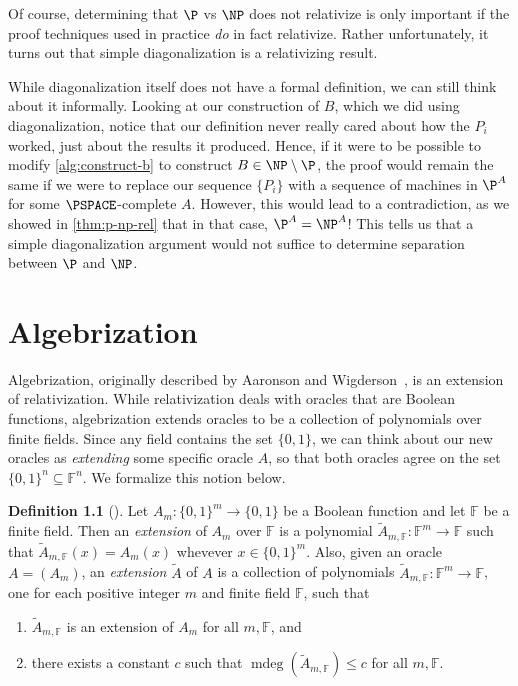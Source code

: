 \documentclass[english]{reedthesis}
\theoremstyle{plain}
\theoremstyle{definition}
\newtheorem{defn}[defn]{Definition}
\theoremstyle{remark}
\DeclareMathOperator{\mdeg}{mdeg}
\begin{document}
Of course, determining that $\P$ vs $\NP$ does not relativize is only important
if the proof techniques used in practice \emph{do} in fact relativize. Rather
unfortunately, it turns out that simple diagonalization is a relativizing
result.

While diagonalization itself does not have a formal definition, we can still
think about it informally. Looking at our construction of $B$, which we did
using diagonalization, notice that our definition never really cared about how
the $P_{i}$ worked, just about the results it produced. Hence, if it were to be
possible to modify \cref{alg:construct-b} to construct $B \in \NP \setminus \P$, the proof
would remain the same if we were to replace our sequence $\{P_{i}\}$ with a
sequence of machines in $\P^{A}$ for some $\PSPACE$-complete $A$. However, this
would lead to a contradiction, as we showed in \cref{thm:p-np-rel} that in that
case, $\P^{A} = \NP^{A}$! This tells us that a simple diagonalization argument
would not suffice to determine separation between $\P$ and $\NP$.

\chapter{Algebrization}\label{chap:algebrization}

Algebrization, originally described by Aaronson and Wigderson~\cite{AW09}, is an
extension of relativization. While relativization deals with oracles that are
Boolean functions, algebrization extends oracles to be a collection of
polynomials over finite fields. Since any field contains the set $\{0, 1\}$, we
can think about our new oracles as \emph{extending} some specific oracle $A$, so
that both oracles agree on the set $\{0, 1\}^{n} \subseteq \mathbb{F}^{n}$. We formalize
this notion below.

\begin{defn}[{\cite[Def.\ 2.2]{AW09}}]\label{def:ext-oracle}
  Let $A_{m}: \{0, 1\}^{m} \rightarrow \{0, 1\}$ be a Boolean function and let
  $\mathbb{F}$ be a finite field. Then an \emph{extension} of $A_{m}$ over
  $\mathbb{F}$ is a polynomial
  $\tilde{A}_{m,\mathbb{F}}: \mathbb{F}^{m} \rightarrow \mathbb{F}$ such that
  $\tilde{A}_{m,\mathbb{F}}(x) = A_{m}(x)$ whevever $x \in \{0, 1\}^{m}$. Also,
  given an oracle $A = (A_{m})$, an \emph{extension} $\tilde{A}$ of $A$ is a
  collection of polynomials
  $\tilde{A}_{m,\mathbb{F}}: \mathbb{F}^{m} \rightarrow \mathbb{F}$, one for each positive
  integer $m$ and finite field $\mathbb{F}$, such that
  \begin{enumerate}
    \item $\tilde{A}_{m,\mathbb{F}}$ is an extension of $A_{m}$ for all
          $m,\mathbb{F}$, and
    \item there exists a constant $c$ such that
          $\mdeg(\tilde{A}_{m,\mathbb{F}}) \le c$ for all $m, \mathbb{F}$.
  \end{enumerate}
\end{defn}
\end{document}
